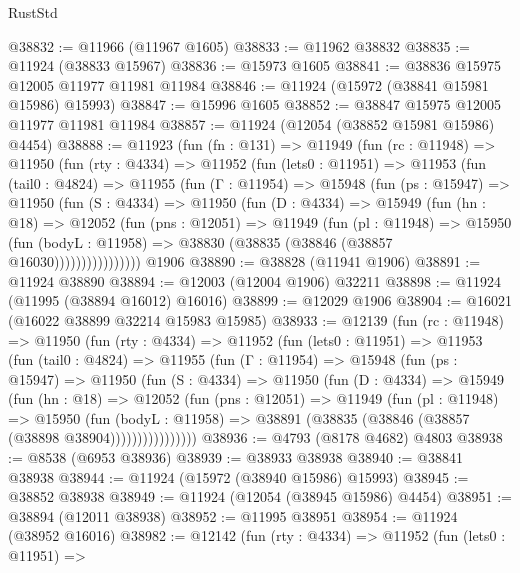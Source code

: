 \begin{lexlean}{RustStd}
\begin{coremodule}
{\begin{coremodule}
{{{{{{{{{{{{{{{{{{{{{{{{{{{{{{{{{{{{{{{{{{{{{{{{{{{{{{{{{{{{{{{{{{{{{{{{{{{{{{{{@38832 := @11966 (@11967 @1605)
@38833 := @11962 @38832
@38835 := @11924 (@38833 @15967)
@38836 := @15973 @1605
@38841 := @38836 @15975 @12005 @11977 @11981 @11984
@38846 := @11924 (@15972 (@38841 @15981 @15986) @15993)
@38847 := @15996 @1605
@38852 := @38847 @15975 @12005 @11977 @11981 @11984
@38857 := @11924 (@12054 (@38852 @15981 @15986) @4454)
@38888 := @11923
    (fun (fn : @131) =>
    @11949
      (fun (rc : @11948) =>
      @11950
        (fun (rty : @4334) =>
        @11952
          (fun (lets0 : @11951) =>
          @11953
            (fun (tail0 : @4824) =>
            @11955
              (fun (Γ : @11954) =>
              @15948
                (fun (ps : @15947) =>
                @11950
                  (fun (S : @4334) =>
                  @11950
                    (fun (D : @4334) =>
                    @15949
                      (fun (hn : @18) =>
                      @12052
                        (fun (pns : @12051) =>
                        @11949
                          (fun (pl : @11948) =>
                          @15950
                            (fun (bodyL : @11958) =>
                            @38830 (@38835 (@38846 (@38857 @16030))))))))))))))))
    @1906
@38890 := @38828 (@11941 @1906)
@38891 := @11924 @38890
@38894 := @12003 (@12004 @1906) @32211
@38898 := @11924 (@11995 (@38894 @16012) @16016)
@38899 := @12029 @1906
@38904 := @16021 (@16022 @38899 @32214 @15983 @15985)
@38933 := @12139
    (fun (rc : @11948) =>
    @11950
      (fun (rty : @4334) =>
      @11952
        (fun (lets0 : @11951) =>
        @11953
          (fun (tail0 : @4824) =>
          @11955
            (fun (Γ : @11954) =>
            @15948
              (fun (ps : @15947) =>
              @11950
                (fun (S : @4334) =>
                @11950
                  (fun (D : @4334) =>
                  @15949
                    (fun (hn : @18) =>
                    @12052
                      (fun (pns : @12051) =>
                      @11949
                        (fun (pl : @11948) =>
                        @15950
                          (fun (bodyL : @11958) =>
                          @38891 (@38835 (@38846 (@38857 (@38898 @38904))))))))))))))))
@38936 := @4793 (@8178 @4682) @4803
@38938 := @8538 (@6953 @38936)
@38939 := @38933 @38938
@38940 := @38841 @38938
@38944 := @11924 (@15972 (@38940 @15986) @15993)
@38945 := @38852 @38938
@38949 := @11924 (@12054 (@38945 @15986) @4454)
@38951 := @38894 (@12011 @38938)
@38952 := @11995 @38951
@38954 := @11924 (@38952 @16016)
@38982 := @12142
    (fun (rty : @4334) =>
    @11952
      (fun (lets0 : @11951) =>
}}}}}}}}}}}}}}}}}}}}}}}}}}}}}}}}}}}}}}}}}}}}}}}}}}}}}}}}}}}}}}}}}}}}}}}}}}}}}}}}
\end{coremodule}}
\end{coremodule}
\end{lexlean}
